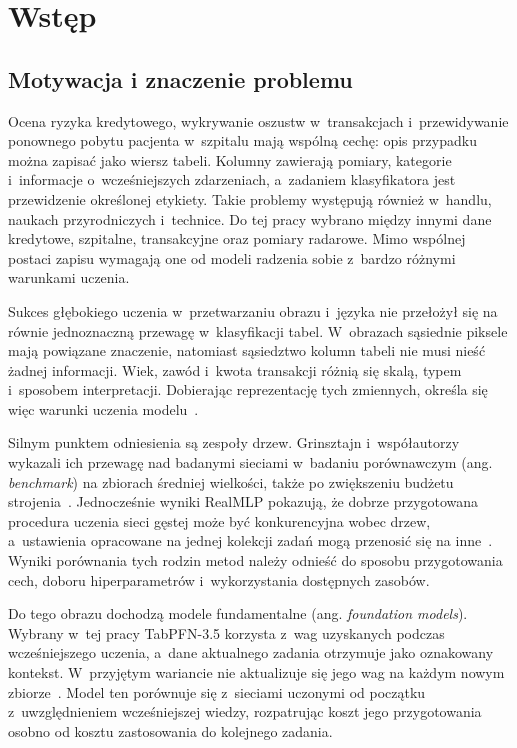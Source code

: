 \clearpage
\section{Wstęp}
\label{chap:wstep}

\subsection{Motywacja i znaczenie problemu}
\label{sec:motywacja}

Ocena ryzyka kredytowego, wykrywanie oszustw w~transakcjach i~przewidywanie ponownego pobytu pacjenta w~szpitalu mają wspólną cechę: opis przypadku można zapisać jako wiersz tabeli. Kolumny zawierają pomiary, kategorie i~informacje o~wcześniejszych zdarzeniach, a~zadaniem klasyfikatora jest przewidzenie określonej etykiety. Takie problemy występują również w~handlu, naukach przyrodniczych i~technice. Do tej pracy wybrano między innymi dane kredytowe, szpitalne, transakcyjne oraz pomiary radarowe. Mimo wspólnej postaci zapisu wymagają one od modeli radzenia sobie z~bardzo różnymi warunkami uczenia.

Sukces głębokiego uczenia w~przetwarzaniu obrazu i~języka nie przełożył się na równie jednoznaczną przewagę w~klasyfikacji tabel. W~obrazach sąsiednie piksele mają powiązane znaczenie, natomiast sąsiedztwo kolumn tabeli nie musi nieść żadnej informacji. Wiek, zawód i~kwota transakcji różnią się skalą, typem i~sposobem interpretacji. Dobierając reprezentację tych zmiennych, określa się więc warunki uczenia modelu~\cite{borisov2022survey}.

Silnym punktem odniesienia są zespoły drzew. Grinsztajn i~współautorzy wykazali ich przewagę nad badanymi sieciami w~badaniu porównawczym (ang. \textit{benchmark}) na zbiorach średniej wielkości, także po zwiększeniu budżetu strojenia~\cite{grinsztajn2022trees}. Jednocześnie wyniki RealMLP pokazują, że dobrze przygotowana procedura uczenia sieci gęstej może być konkurencyjna wobec drzew, a~ustawienia opracowane na jednej kolekcji zadań mogą przenosić się na inne~\cite{holzmueller2024realmlp}. Wyniki porównania tych rodzin metod należy odnieść do sposobu przygotowania cech, doboru hiperparametrów i~wykorzystania dostępnych zasobów.

Do tego obrazu dochodzą modele fundamentalne (ang. \textit{foundation models}). Wybrany w~tej pracy TabPFN-3.5 korzysta z~wag uzyskanych podczas wcześniejszego uczenia, a~dane aktualnego zadania otrzymuje jako oznakowany kontekst. W~przyjętym wariancie nie aktualizuje się jego wag na każdym nowym zbiorze~\cite{jaeger2026tabpfn35}. Model ten porównuje się z~sieciami uczonymi od początku z~uwzględnieniem wcześniejszej wiedzy, rozpatrując koszt jego przygotowania osobno od kosztu zastosowania do kolejnego zadania.

